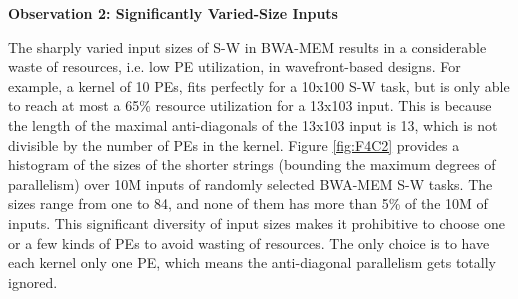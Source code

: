\vspace{1pt}
\textbf{Observation 2: Significantly Varied-Size Inputs}
\vspace{1pt}

The sharply varied input sizes of S-W in BWA-MEM results in a considerable waste of resources, i.e. low PE utilization, in wavefront-based designs. 
For example, a kernel of 10 PEs, fits perfectly for a 10x100 S-W task, but is only able to reach at most a 65\% resource utilization for a 13x103 input. 
This is because the length of the maximal anti-diagonals of the 13x103 input is 13, 
which is not divisible by the number of PEs in the kernel.
Figure \ref{fig:F4C2} provides a histogram of the sizes of the shorter strings (bounding the maximum degrees of parallelism) over 10M inputs of randomly selected BWA-MEM S-W tasks. 
The sizes range from one to 84, and none of them has more than 5\% of the 10M of inputs. 
This significant diversity of input sizes makes it prohibitive to choose one or a few kinds of PEs to avoid wasting of resources.
The only choice is to have each kernel only one PE, which means the anti-diagonal parallelism gets totally ignored.


